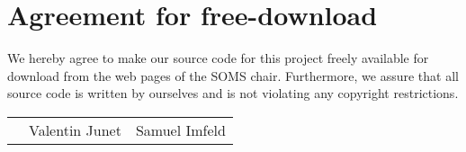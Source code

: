 \documentclass[11pt]{article}
\begin{document}

\newpage


\newpage

\setcounter{page}{1}

\section*{Agreement for free-download}
\bigskip


\bigskip


\large We hereby agree to make our source code for this project freely available for download from the web pages of the SOMS chair. Furthermore, we assure that all source code is written by ourselves and is not violating any copyright restrictions.

\begin{center}

\bigskip


\bigskip


\begin{tabular}{@{}p{3.3cm}@{}p{6cm}@{}@{}p{6cm}@{}}
\begin{minipage}{3cm}

\end{minipage}
&
\begin{minipage}{6cm}
\vspace{2mm} \large Valentin Junet

 \vspace{\baselineskip}

\end{minipage}
&
\begin{minipage}{6cm}

\large Samuel Imfeld

\end{minipage}
\end{tabular}


\end{center}
\newpage






\end{document}

